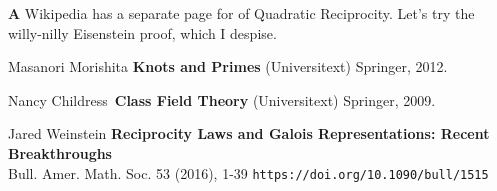 \documentclass[12pt]{article}
\begin{document}
\noindent \textbf{A} Wikipedia has a separate page for  of Quadratic Reciprocity.  Let's try the willy-nilly Eisenstein proof, which I despise.

\vfill

\begin{thebibliography}{}

\item Masanori Morishita \textbf{Knots and Primes} (Universitext) Springer, 2012.

\item Nancy Childress \;\;\;\,\textbf{Class Field Theory} (Universitext) Springer, 2009.

\item  Jared Weinstein \textbf{Reciprocity Laws and Galois Representations: Recent Breakthroughs} \\ 
Bull. Amer. Math. Soc. 53 (2016), 1-39 \hfill \texttt{https://doi.org/10.1090/bull/1515} 

\end{thebibliography}
\end{document}
